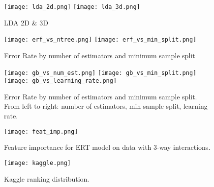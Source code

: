 \documentclass[11pt]{article}
\begin{document}
\begin{figure}[h]
\label{lda}
\begin{center}
\texttt{[image: lda\_2d.png]}
\texttt{[image: lda\_3d.png]}
\end{center}
\caption{LDA 2D $\&$ 3D}
\end{figure}

\begin{figure}[ht]
\label{ert_grid}
\begin{center}
\texttt{[image: erf\_vs\_ntree.png]}
\texttt{[image: erf\_vs\_min\_split.png]}
\end{center}
\caption{Error Rate by number of estimators and minimum sample split}
\end{figure}

\begin{figure}[ht]
\label{gb_grid}
\begin{center}
\texttt{[image: gb\_vs\_num\_est.png]}
\texttt{[image: gb\_vs\_min\_split.png]}
\texttt{[image: gb\_vs\_learning\_rate.png]}
\end{center}
\caption{Error Rate by number of estimators and minimum sample split. From left to right: number of estimators, min sample split, learning rate.}
\end{figure}

\begin{figure}[ht]
\label{feat_imp}
\begin{center}
\texttt{[image: feat\_imp.png]}
\end{center}
\caption{Feature importance for ERT model on data with 3-way interactions.}
\end{figure}

\begin{figure}[ht]
\label{kaggle_rank}
\begin{center}
\texttt{[image: kaggle.png]}
\end{center}
\caption{Kaggle ranking distribution.}
\end{figure}
\end{document}
